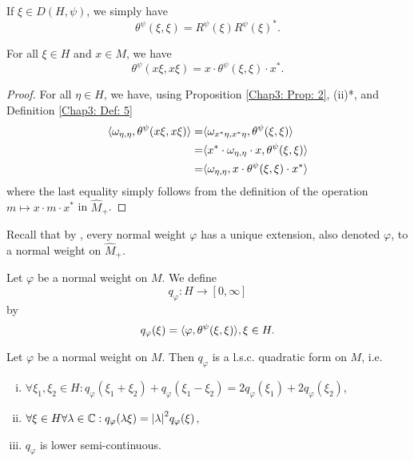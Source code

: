 \begin{remark}
    If $\xi\in D(H,\psi)$, we simply have
    \begin{equation}
        \theta^\psi(\xi,\xi)=R^\psi(\xi)R^\psi(\xi)^*.
    \end{equation}
\end{remark}
\begin{proposition}\label{Chap3: Prop: 7}
    For all $\xi\in H$ and $x\in M$, we have
    \[
        \theta^\psi(x\xi,x\xi)=x\cdot \theta^\psi(\xi,\xi)\cdot x^*.
    \]
\end{proposition}
\begin{proof}
    For all $\eta\in H$, we have, using Proposition \ref{Chap3: Prop: 2}, (ii)*, and Definition \ref{Chap3: Def: 5}
    \[
        \begin{split}
            \langle\omega_{\eta,\eta},\theta^\psi(x\xi,x\xi)\rangle=&\langle\omega_{x^*\eta,x^*\eta},\theta^\psi(\xi,\xi)\rangle\\
            =&\langle x^*\cdot\omega_{\eta,\eta}\cdot x,\theta^\psi(\xi,\xi)\rangle\\
            =&\langle\omega_{\eta,\eta},x\cdot\theta^\psi(\xi,\xi)\cdot x^*\rangle
        \end{split}
    \]
    where the last equality simply follows from the definition of the operation $m\mapsto x\cdot m\cdot x^*$ in $\widehat{M}_+$.
\end{proof}
Recall that by \cite[Proposition 1.10]{7}, every normal weight $\varphi$ has a unique extension, also denoted $\varphi$, to a normal weight on $\widehat{M}_+$.
\begin{definition}
    Let $\varphi$ be a normal weight on $M$. We define
    \[
        q_\varphi: H\to [0,\infty]
    \]
    by
    \begin{equation}
        q_\varphi(\xi)=\langle\varphi,\theta^\psi(\xi,\xi)\rangle, \xi\in H.
    \end{equation}
\end{definition}
\begin{proposition}\label{Chap3: Prop: 9}
    Let $\varphi$ be a normal weight on $M$. Then $q_\varphi$ is a l.s.c. quadratic form on $M$, i.e.
    \begin{enumerate}[(i)]
        \item $\forall \xi_1,\xi_2\in H:q_\varphi(\xi_1+\xi_2)+q_\varphi(\xi_1-\xi_2)=2q_\varphi(\xi_1)+2q_\varphi(\xi_2)$,
        \item $\forall \xi\in H \forall \lambda\in \mathbb{C}: q_\varphi(\lambda \xi)=\abs{\lambda}^2q_\varphi(\xi)$,
        \item $q_\varphi$ is lower semi-continuous.
    \end{enumerate}
\end{proposition}
